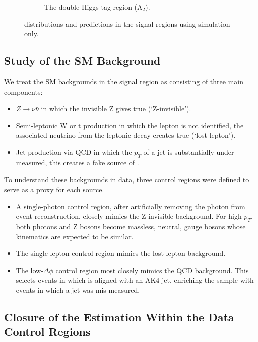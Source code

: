 \begin{figure}
\begin{subfigure}[b]{0.5\textwidth}
\caption{The double Higgs tag region (A$_{2}$).}
\end{subfigure}
\caption{\ptmiss distributions and predictions in the signal regions using simulation only.}
\label{fig:mcclosure}
\end{figure}

\subsection{Study of the SM Background}
\label{sec:smbkg}

We treat the SM backgrounds in the signal region as consisting of three main components:
\begin{itemize}
\item $Z\rightarrow\nu\bar{\nu}$ in which the invisible Z gives true \ptmiss (`Z-invisible').
\item Semi-leptonic W or t production in which the lepton is not identified, the associated neutrino from the leptonic decay creates true \ptmiss (`lost-lepton').
\item Jet production via QCD in which the $p_{T}$ of a jet is substantially under-measured, this creates a fake source of \ptmiss.
\end{itemize}

To understand these backgrounds in data, three control regions were defined to serve as a proxy for each source.
\begin{itemize}
\item A single-photon control region, after artificially removing the photon from event reconstruction, closely mimics the Z-invisible background. For high-$p_{T}$, both photons and Z bosons become massless, neutral, gauge bosons whose kinematics are expected to be similar.
\item The single-lepton control region mimics the lost-lepton background.
\item The low-$\Delta\phi$ control region most closely mimics the QCD background. This selects events in which \ptmiss is aligned with an AK4 jet, enriching the sample with events in which a jet was mis-measured.
\end{itemize}

\subsection{Closure of the Estimation Within the Data Control Regions}

